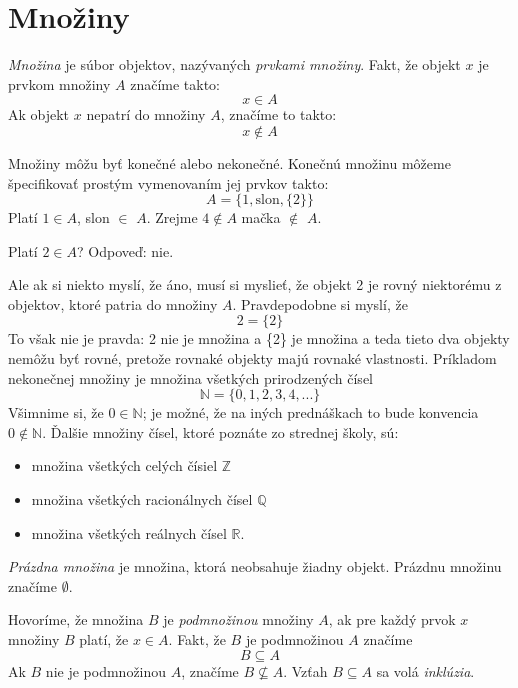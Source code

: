 \section{Množiny}

\begin{definition}[Množina]\label{def:mnozina}
\emph{Množina} je súbor objektov, nazývaných \emph{prvkami množiny}.
Fakt, že objekt $x$ je prvkom množiny $A$ značíme takto:
$$x \in A$$
Ak objekt $x$ nepatrí do množiny $A$, značíme to takto:
$$x \notin A$$
\end{definition}

Množiny môžu byť konečné alebo nekonečné.
Konečnú množinu môžeme špecifikovať prostým vymenovaním jej prvkov takto:
$$A = \{1, \text{slon}, \{2\}\}$$
Platí $1 \in A$, slon $\in$ $A$.
Zrejme $4 \notin A$ mačka $\notin$ $A$.

\begin{question}
Platí $2 \in A$?
Odpoveď: nie.
\end{question}

Ale ak si niekto myslí, že áno, musí si myslieť, že objekt 2 je rovný niektorému z objektov, ktoré patria do množiny $A$.
Pravdepodobne si myslí, že
$$2 = \{2\}$$
To však nie je pravda: 2 nie je množina a \{2\} je množina a teda tieto dva objekty nemôžu byť rovné, pretože rovnaké objekty majú rovnaké vlastnosti.
Príkladom nekonečnej množiny je množina všetkých prirodzených čísel
$$\mathbb{N}=\{0,1,2,3,4,...\}$$
Všimnime si, že $0 \in \mathbb{N}$;
je možné, že na iných prednáškach to bude konvencia $0 \notin \mathbb{N}$.
Ďalšie množiny čísel, ktoré poznáte zo strednej školy, sú:
\begin{itemize}
    \item množina všetkých celých čísiel $\mathbb{Z}$
    \item množina všetkých racionálnych čísel $\mathbb{Q}$
    \item množina všetkých reálnych čísel $\mathbb{R}$.
\end{itemize}

\begin{definition}
\emph{Prázdna množina} je množina, ktorá neobsahuje žiadny objekt. Prázdnu množinu značíme $\emptyset$.
\end{definition}

\begin{definition}[Podmnožina]
Hovoríme, že množina $B$ je \emph{podmnožinou} množiny $A$, ak pre každý prvok $x$ množiny $B$ platí, že $x \in A$.
Fakt, že $B$ je podmnožinou $A$ značíme
$$B \subseteq A$$
Ak $B$ nie je podmnožinou $A$, značíme $B \not\subseteq A$.
Vzťah $B \subseteq A$ sa volá \emph{inklúzia}.
\end{definition}

